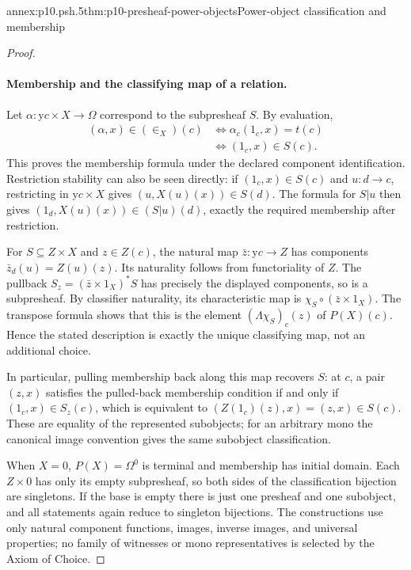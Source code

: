 \begin{annexitem}{annex:p10.psh.5}{thm:p10-presheaf-power-objects}{Power-object classification and membership}
\begin{proof}
\paragraph{Membership and the classifying map of a relation.}
Let \(\alpha:\mathrm y c\times X\to\Omega\) correspond to
the subpresheaf \(S\).
By evaluation,
\[
\begin{aligned}
 (\alpha,x)\in(\in_X)(c)
 &\Longleftrightarrow \alpha_c(1_c,x)=t(c)\\
 &\Longleftrightarrow (1_c,x)\in S(c).
\end{aligned}
\]
This proves the membership formula under the declared
component identification.
Restriction stability can also be seen directly:
if \((1_c,x)\in S(c)\) and \(u:d\to c\), restricting in
\(\mathrm y c\times X\) gives \((u,X(u)(x))\in S(d)\).
The formula for \(S|u\) then gives
\((1_d,X(u)(x))\in(S|u)(d)\), exactly the required
membership after restriction.

For \(S\subseteq Z\times X\) and \(z\in Z(c)\), the natural
map \(\bar z:\mathrm y c\to Z\) has components
\(\bar z_d(u)=Z(u)(z)\).
Its naturality follows from functoriality of \(Z\).
The pullback \(S_z=(\bar z\times1_X)^*S\) has precisely
the displayed components, so is a subpresheaf.
By classifier naturality, its characteristic map is
\(\chi_S\circ(\bar z\times1_X)\).
The transpose formula shows that this is the element
\((\Lambda\chi_S)_c(z)\) of \(P(X)(c)\).
Hence the stated description is exactly the unique
classifying map, not an additional choice.

In particular, pulling membership back along this map
recovers \(S\): at \(c\), a pair \((z,x)\) satisfies the
pulled-back membership condition if and only if
\((1_c,x)\in S_z(c)\), which is equivalent to
\((Z(1_c)(z),x)=(z,x)\in S(c)\).
These are equality of the represented subobjects; for
an arbitrary mono the canonical image convention gives
the same subobject classification.

When \(X=0\), \(P(X)=\Omega^0\) is terminal and membership
has initial domain.  Each \(Z\times0\) has only its empty
subpresheaf, so both sides of the classification bijection
are singletons.  If the base is empty there is just one
presheaf and one subobject, and all statements again
reduce to singleton bijections.  The constructions use
only natural component functions, images, inverse images,
and universal properties; no family of witnesses or
mono representatives is selected by the Axiom of Choice.
\end{proof}
\end{annexitem}
